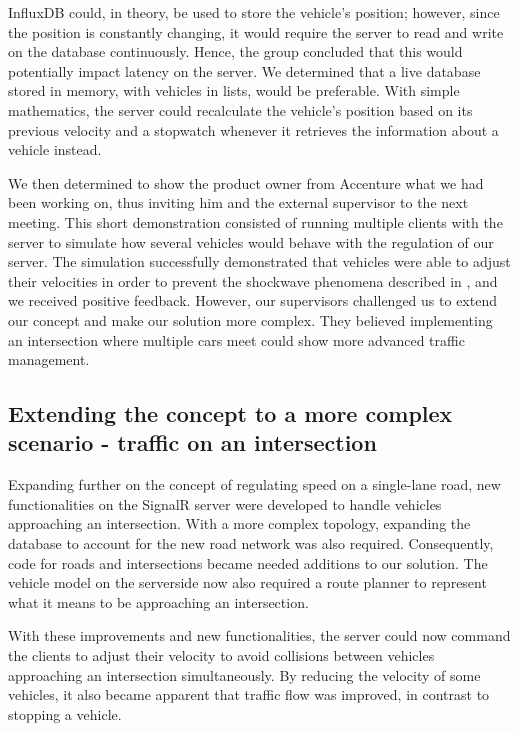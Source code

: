 InfluxDB could, in theory, be used to store the vehicle's position; however, since the position is constantly changing, it would require the server to read and write on the database continuously. Hence, the group concluded that this would potentially impact latency on the server. We determined that a live database stored in memory, with vehicles in lists, would be preferable. With simple mathematics, the server could recalculate the vehicle's position based on its previous velocity and a stopwatch whenever it retrieves the information about a vehicle instead.

We then determined to show the product owner from Accenture what we had been working on, thus inviting him and the external supervisor to the next meeting. This short demonstration consisted of running multiple clients with the server to simulate how several vehicles would behave with the regulation of our server. The simulation successfully demonstrated that vehicles were able to adjust their velocities in order to prevent the shockwave phenomena described in , and we received positive feedback. However, our supervisors challenged us to extend our concept and make our solution more complex. They believed implementing an intersection where multiple cars meet could show more advanced traffic management.

\subsection{Extending the concept to a more complex scenario - traffic on an intersection}
Expanding further on the concept of regulating speed on a single-lane road, new functionalities on the SignalR server were developed to handle vehicles approaching an intersection. With a more complex topology, expanding the database to account for the new road network was also required. Consequently, code for roads and intersections became needed additions to our solution. The vehicle model on the serverside now also required a route planner to represent what it means to be approaching an intersection.

With these improvements and new functionalities, the server could now command the clients to adjust their velocity to avoid collisions between vehicles approaching an intersection simultaneously. By reducing the velocity of some vehicles, it also became apparent that traffic flow was improved, in contrast to stopping a vehicle.